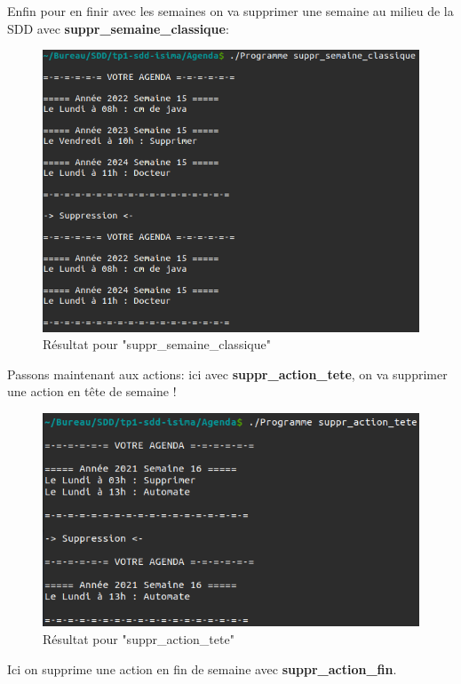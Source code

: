 \documentclass[12pt,french]{article} %
\begin{document}
Enfin pour en finir avec les semaines on va supprimer une semaine au milieu de la SDD avec \textbf{suppr\_semaine\_classique}:\newline

\begin{figure}[H]
	\includegraphics[scale=0.6]{su-sc.png}
	\centering
	\caption{Résultat pour "suppr\_semaine\_classique"}
\end{figure}

Passons maintenant aux actions: ici avec \textbf{suppr\_action\_tete}, on va supprimer une action en tête de semaine !\newline

\begin{figure}[H]
	\includegraphics[scale=0.6]{su-at.png}
	\centering
	\caption{Résultat pour "suppr\_action\_tete"}
\end{figure}

Ici on supprime une action en fin de semaine avec \textbf{suppr\_action\_fin}.\newline
\end{document}
